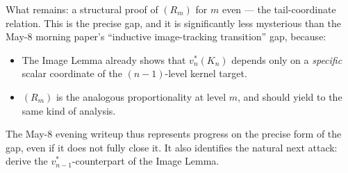 \documentclass[11pt]{article}
\theoremstyle{definition}
\begin{document}
What remains: a structural proof of $(R_m)$ for $m$ even — the
tail-coordinate relation. This is the precise gap, and it is
significantly less mysterious than the May-8 morning paper's
``inductive image-tracking transition'' gap, because:
\begin{itemize}[topsep=0.3em,itemsep=0.2em,leftmargin=2em]
\item The Image Lemma already shows that $v_n^*(K_n)$ depends only
  on a \emph{specific} scalar coordinate of the $(n-1)$-level
  kernel target.
\item $(R_m)$ is the analogous proportionality at level $m$, and
  should yield to the same kind of analysis.
\end{itemize}

The May-8 evening writeup thus represents progress on the precise
form of the gap, even if it does not fully close it. It also
identifies the natural next attack: derive the
$v_{n-1}^*$-counterpart of the Image Lemma.
\end{document}
